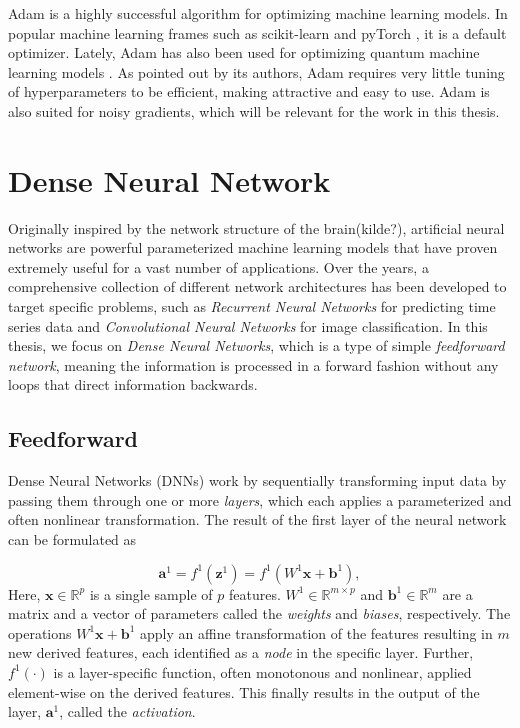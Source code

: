 Adam is a highly successful algorithm for optimizing machine learning models. In popular machine learning frames such as scikit-learn \cite{scikit-learn} and pyTorch \cite{pytorch}, it is a default optimizer. Lately, Adam has also been used for optimizing quantum machine learning models \cite{abbas2020power, skolik2020layerwise}. As pointed out by its authors, Adam requires very little tuning of hyperparameters to be efficient, making attractive and easy to use. Adam is also suited for noisy gradients, which will be relevant for the work in this thesis. 

\section{Dense Neural Network}\label{sec:DenseNeuralNetwork}
Originally inspired by the network structure of the brain(kilde?), artificial neural networks are powerful parameterized machine learning models that have proven extremely useful for a vast number of applications. Over the years, a comprehensive collection of different network architectures has been developed to target specific problems, such as \emph{Recurrent Neural Networks} for predicting time series data and \emph{Convolutional Neural Networks} for image classification. In this thesis, we focus on \emph{Dense Neural Networks}, which is a type of simple \emph{feedforward network}, meaning the information is processed in a forward fashion without any loops that direct information backwards.

\subsection{Feedforward}\label{sec:FeedforwardDNN}
Dense Neural Networks (DNNs) work by sequentially transforming input data by passing them through one or more \emph{layers}, which each applies a parameterized and often nonlinear transformation. The result of the first layer of the neural network can be formulated as

\begin{equation}\label{eq:FeedforwardSingle}
    \boldsymbol{a}^1 = f^1(\boldsymbol{z}^1) = f^1(W^1 \boldsymbol{x} + \boldsymbol{b}^1),
\end{equation}
Here, $\boldsymbol{x} \in \mathbb{R}^p$ is a single sample of $p$ features. $W^1 \in \mathbb{R}^{m \times p}$ and $\boldsymbol{b}^1 \in \mathbb{R}^{m}$ are a matrix and a vector of parameters called the \emph{weights} and \emph{biases}, respectively. The operations $W^1 \boldsymbol{x} + \boldsymbol{b}^1$ apply an affine transformation of the features resulting in $m$ new derived features, each identified as a \emph{node} in the specific layer. Further, $f^1(\cdot)$ is a layer-specific function, often monotonous and nonlinear, applied element-wise on the derived features. This finally results in the output of the layer, $\boldsymbol{a}^1$, called the \emph{activation}.


